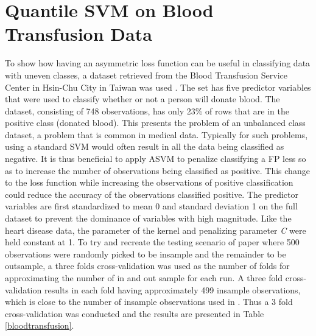 \documentclass[twoside,11pt]{article}
\begin{document}
\section{Quantile SVM on Blood Transfusion Data}
To show how having an asymmetric loss function can be useful in classifying data with uneven classes, a dataset retrieved from the Blood Transfusion Service Center in Hsin-Chu City in Taiwan was used \citep{Yeh09}. The set has five predictor variables that were used to classify whether or not a person will donate blood. The dataset, consisting of 748 observations, has only 23\% of rows that are in the positive class (donated blood). This presents the problem of an unbalanced class dataset, a problem that is common in medical data. Typically for such problems, using a standard SVM would often result in all the data being classified as negative. It is thus beneficial to apply ASVM to penalize classifying a FP less so as to increase the number of observations being classified as positive. This change to the loss function while increasing the observations of positive classification could reduce the accuracy of the observations classified positive. The predictor variables are first standardized to mean 0 and standard deviation 1 on the full dataset to prevent the dominance of variables with high magnitude. Like the heart disease data, the parameter of the kernel and penalizing parameter \emph{C} were held constant at 1. To try and recreate the testing scenario of \citet{Yeh09} paper where 500 observations were randomly picked to be insample and the remainder to be outsample, a three folds cross-validation was used as the number of folds for approximating the number of in and out sample for each run. A three fold cross-validation results in each fold having approximately 499 insample observations, which is close to the number of insample observations used in \citet{Yeh09}. Thus a 3 fold cross-validation was conducted and the results are presented in Table \ref{bloodtransfusion}.
\end{document}
